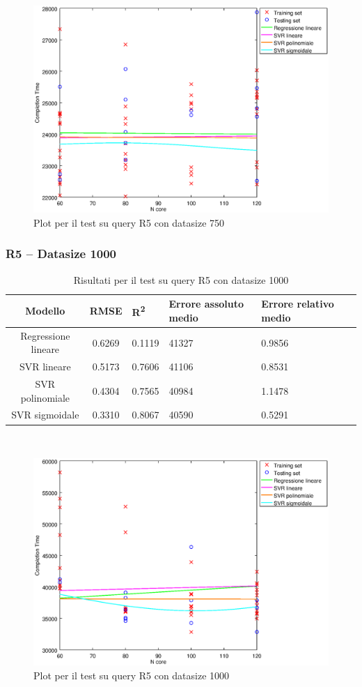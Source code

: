 \documentclass[a4paper,11pt]{article}
\begin{document}
\begin {figure}[hbtp]
\centering
\includegraphics[width=\textwidth]{output/R5_750/plot_R5_750.eps}
\caption {Plot per il test su query R5 con datasize 750}
\end {figure}
\newpage
\subsubsection{R5 -- Datasize 1000}
\begin{table}[bhpt]
	\centering
	\begin{adjustbox}{center}
		\begin{tabular}{c | c M{1cm} M{2.5cm} M{2.5cm} M{1.8cm}}
			Modello & RMSE & R\textsuperscript{2} & Errore assoluto medio & Errore relativo medio \tabularnewline
			\hline
			Regressione lineare & 0.6269 & 0.1119 &  41327 & 0.9856 \\
			SVR lineare & 0.5173 & 0.7606 &  41106 & 0.8531 \\
			SVR polinomiale & 0.4304 & 0.7565 &  40984 & 1.1478 \\
			SVR sigmoidale & 0.3310 & 0.8067 &  40590 & 0.5291 \\
		\end{tabular}
	\end{adjustbox}
	\\
	\caption{Risultati per il test su query R5 con datasize 1000}
	\label{table_R5_1000}
\end{table}

\begin {figure}[hbtp]
\centering
\includegraphics[width=\textwidth]{output/R5_1000/plot_R5_1000.eps}
\caption {Plot per il test su query R5 con datasize 1000}
\end {figure}
\end{document}
